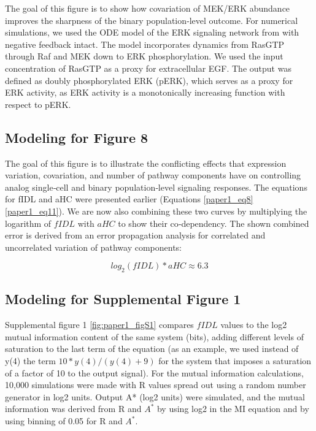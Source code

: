 The goal of this figure is to show how covariation of MEK/ERK abundance improves the sharpness of the binary population‐level outcome. For numerical simulations, we used the ODE model of the ERK signaling network from \cite{Sturm2010} with negative feedback intact. The model incorporates dynamics from RasGTP through Raf and MEK down to ERK phosphorylation. We used the input concentration of RasGTP as a proxy for extracellular EGF. The output was defined as doubly phosphorylated ERK (pERK), which serves as a proxy for ERK activity, as ERK activity is a monotonically increasing function with respect to pERK.

\subsection{Modeling for Figure 8}

The goal of this figure is to illustrate the conflicting effects that expression variation, covariation, and number of pathway components have on controlling analog single‐cell and binary population‐level signaling responses. The equations for fIDL and aHC were presented earlier (Equations \ref{paper1_eq8} \ref{paper1_eq11}). We are now also combining these two curves by multiplying the logarithm of $fIDL$ with $aHC$ to show their co‐dependency. The shown combined error is derived from an error propagation analysis for correlated and uncorrelated variation of pathway components:

\begin{equation}\label{paper1_eq12}
log_2(fIDL) * aHC \approx 6.3
\end{equation}

\subsection{Modeling for Supplemental Figure 1}

Supplemental figure 1 \ref{fig:paper1_figS1} compares $fIDL$ values to the log2 mutual information content of the same system (bits), adding different levels of saturation to the last term of the equation (as an example, we used instead of y(4) the term $10*y(4)/(y(4)+9)$ for the system that imposes a saturation of a factor of 10 to the output signal). For the mutual information calculations, 10,000 simulations were made with R values spread out using a random number generator in log2 units. Output A* (log2 units) were simulated, and the mutual information was derived from R and $A^*$ by using log2 in the MI equation and by using binning of 0.05 for R and $A^*$.

